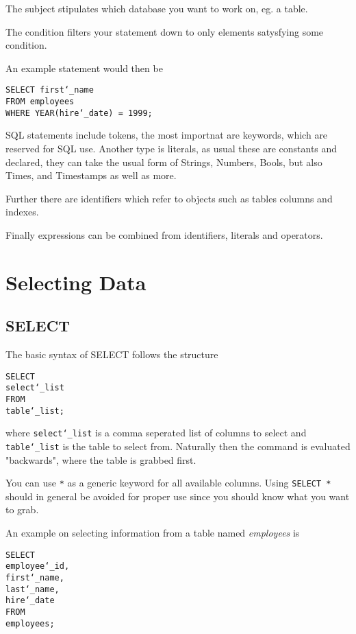 \documentclass[10pt, english]{article}
\begin{document}
The subject stipulates which database you want to work on, eg. a table.

The condition filters your statement down to only elements satysfying some condition.

An example statement would then be 

\texttt{SELECT first\char`_name \\
FROM employees \\
WHERE YEAR(hire\char`_date) = 1999;}

SQL statements include tokens, the most importnat are keywords, which are reserved
for SQL use. Another type is literals, as usual these are constants and declared,
they can take the usual form of Strings, Numbers, Bools, but also Times, and Timestamps
as well as more.

Further there are identifiers which refer to objects such as tables columns and indexes.

Finally expressions can be combined from identifiers, literals and operators.

\newpage

\section{Selecting Data}
\subsection{SELECT}
The basic syntax of SELECT follows the structure

\texttt{SELECT \\
\hspace*{10pt} select\char`_list \\
FROM \\ \hspace*{10pt} table\char`_list;}

where \texttt{select\char`_list} is a comma seperated list of columns to select
and \texttt{table\char`_list} is the table to select from. Naturally then the command 
is evaluated "backwards", where the table is grabbed first.

You can use \texttt{*} as a generic keyword for all available columns.
Using \texttt{SELECT *} should in general be avoided for proper use since 
you should know what you want to grab.

An example on selecting information from a table named \textit{employees} is

\texttt{SELECT\\
\hspace*{10pt}employee\char`_id,\\
\hspace*{10pt}first\char`_name,\\
\hspace*{10pt}last\char`_name,\\
\hspace*{10pt}hire\char`_date\\
FROM\\
\hspace*{10pt}employees;
}
\end{document}
